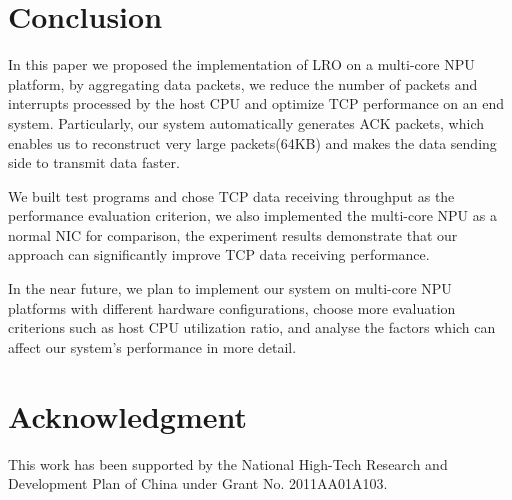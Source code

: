 \documentclass[conference]{IEEEtran}
\begin{document}




\section{Conclusion}
In this paper we proposed the implementation of LRO on a multi-core NPU platform, by aggregating data packets, we reduce the number of packets and interrupts processed by the host CPU and optimize TCP performance on an end system. Particularly, our system automatically generates ACK packets, which enables us to reconstruct very large packets(64KB) and makes the data sending side to transmit data faster.

We built test programs and chose TCP data receiving throughput as the performance evaluation criterion, we also implemented the multi-core NPU as a normal NIC for comparison, the experiment results demonstrate that our approach can significantly improve TCP data receiving performance.

In the near future, we plan to implement our system on multi-core NPU platforms with different hardware configurations, choose more evaluation criterions such as host CPU utilization ratio, and analyse the factors which can affect our system's performance in more detail.


\section*{Acknowledgment}
This work has been supported by the National High-Tech Research and Development Plan of China under Grant No. 2011AA01A103.




\end{document}
